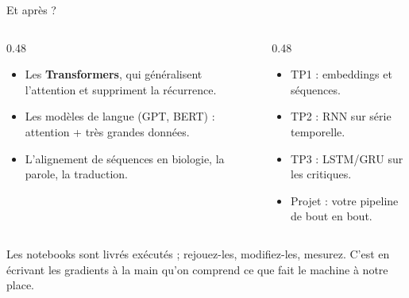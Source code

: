 \begin{frame}{Et après ?}
\begin{columns}[t]
\begin{column}{0.48\textwidth}
\begin{ebox}
\begin{itemize}
  \item Les \textbf{Transformers}, qui généralisent l'attention et suppriment
  la récurrence.
  \item Les modèles de langue (GPT, BERT) : attention + très grandes données.
  \item L'alignement de séquences en biologie, la parole, la traduction.
\end{itemize}
\end{ebox}
\end{column}
\begin{column}{0.48\textwidth}
\begin{ebox}
\begin{itemize}
  \item TP1 : embeddings et séquences.
  \item TP2 : RNN sur série temporelle.
  \item TP3 : LSTM/GRU sur les critiques.
  \item Projet : votre pipeline de bout en bout.
\end{itemize}
\end{ebox}
\end{column}
\end{columns}
\vspace{1.5mm}
\begin{solbox}
Les notebooks sont livrés exécutés ; rejouez-les, modifiez-les, mesurez.
C'est en écrivant les gradients à la main qu'on comprend ce que fait le
machine à notre place.
\end{solbox}
\end{frame}
